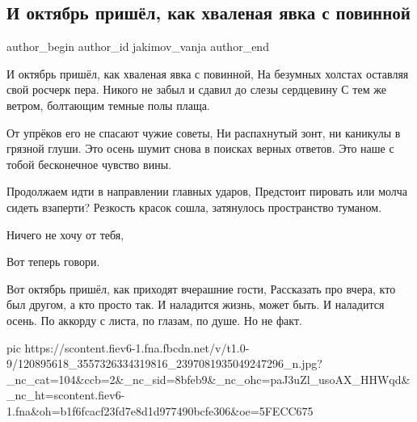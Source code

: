  
 
 
 
 
 
\subsection{И октябрь пришёл, как хваленая явка с повинной}
\label{sec:05_10_2020.fb.jakimov_vanja.1.oktjabr_prishel}
\ifcmt
	author_begin
   author_id jakimov_vanja
	author_end
\fi

\begin{multicols}{2}
	\obeycr
И октябрь пришёл, как хваленая явка с повинной,
На безумных холстах оставляя свой росчерк пера.
Никого не забыл и сдавил до слезы сердцевину
С тем же ветром, болтающим темные полы плаща.

От упрёков его не спасают чужие советы,
Ни распахнутый зонт, ни каникулы в грязной глуши.
Это осень шумит снова в поисках верных ответов.
Это наше с тобой бесконечное чувство вины.

Продолжаем идти в направлении главных ударов,
Предстоит пировать или молча сидеть взаперти?
Резкость красок сошла, затянулось пространство туманом.

Ничего не хочу от тебя,

Вот теперь говори.

Вот октябрь пришёл, как приходят вчерашние гости,
Рассказать про вчера, кто был другом, а кто просто так.
И наладится жизнь, может быть.
И наладится осень.
По аккорду с листа, по глазам, по душе.
Но не факт.
	\restorecr
\end{multicols}

\ifcmt
pic https://scontent.fiev6-1.fna.fbcdn.net/v/t1.0-9/120895618_3557326334319816_2397081935049247296_n.jpg?_nc_cat=104&ccb=2&_nc_sid=8bfeb9&_nc_ohc=paJ3uZl_usoAX_HHWqd&_nc_ht=scontent.fiev6-1.fna&oh=b1f6fcacf23fd7e8d1d977490bcfe306&oe=5FECC675
\fi
